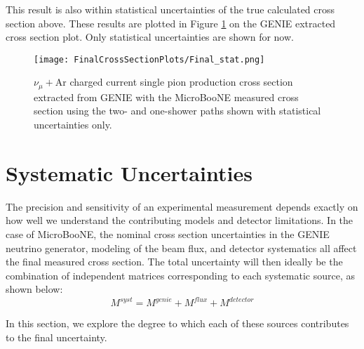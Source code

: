 This result is also within statistical uncertainties of the true calculated cross section above. These results are plotted in Figure \ref{fig:genie_uboone_xsec} on the GENIE extracted cross section plot.  Only statistical uncertainties are shown for now.

\begin{figure}[h!]
\centering
\texttt{[image: FinalCrossSectionPlots/Final\_stat.png]}
\caption{ $\nu_{\mu}+\text{Ar}$ charged current single pion production cross section extracted from GENIE with the MicroBooNE measured cross section using the two- and one-shower paths shown with statistical uncertainties only. }
\label{fig:genie_uboone_xsec}
\end{figure}

\clearpage
\section{Systematic Uncertainties}
The precision and sensitivity of an experimental measurement depends exactly on how well we understand the contributing models and detector limitations. In the case of MicroBooNE, the nominal cross section uncertainties in the GENIE neutrino generator, modeling of the beam flux, and detector systematics all affect the final measured cross section. The total uncertainty will then ideally be the combination of independent matrices corresponding to each systematic source, as shown below:
\begin{equation}
\label{eq:sys_error}
M^{syst} =  M^{genie} + M^{flux} + M^{detector}
\end{equation}

\noindent In this section, we explore the degree to which each of these sources contributes to the final uncertainty. 
